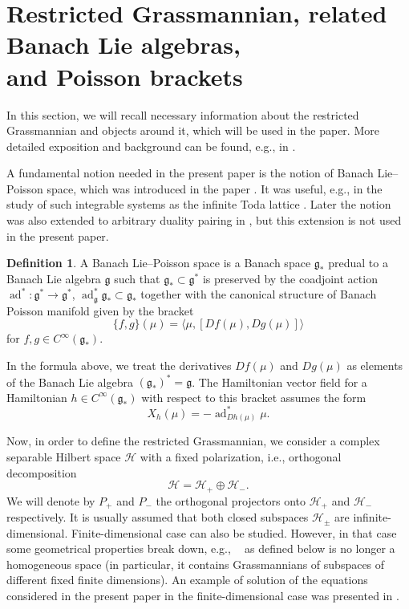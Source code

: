 \documentclass[pdftex]{sigma}
\theoremstyle{definition}
\newtheorem{defn}[thm]{Definition}
\numberwithin{equation}{section}
\renewcommand{\H}{\mathcal{H}}
\newcommand{\g}{\mathfrak{g}}
\DeclareMathOperator{\Gr}{Gr_{res}(\H,\H_+)}
\DeclareMathOperator{\ad}{ad}
\renewcommand{\to}{\rightarrow}
\newcommand{\be}{\begin{equation}}
\newcommand{\ee}{\end{equation}}
\begin{document}
\section[Restricted Grassmannian, related Banach Lie algebras, and Poisson brackets]{Restricted Grassmannian, related Banach Lie algebras,\\ and Poisson brackets}\label{sec:gr}

In this section, we will recall necessary information about the restricted Grassmannian and objects around it, which will be used in the paper. More detailed exposition and background can be found, e.g., in \cite{Ratiu-grass,GO-grass,mickelsson,OR,segal,wurzbacher}.

A fundamental notion needed in the present paper is the notion of Banach Lie--Poisson space, which was introduced in the paper \cite[Definition 4.1 and Theorem 4.2]{OR}. It was useful, e.g., in the study of such integrable systems as the infinite Toda lattice \cite{Oind}. Later the notion was also extended to arbitrary duality pairing in \cite[Definition 3.12 and Theorem 3.14]{tumpach-bruhat}, but this extension is not used in the present paper.


\begin{defn}\label{def:blp}
A Banach Lie--Poisson space is a Banach space $\g_*$ predual to a Banach Lie algebra $\g$ such that $\g_*\subset \g^*$ is preserved by the coadjoint action $\ad^*\colon\g^*\to\g^*$,
$\ad^*_\g \g_*\subset \g_*$
together with the canonical structure of Banach Poisson manifold given by the bracket
\[ %
\{f,g\}(\mu) = \langle \mu, [Df(\mu),Dg(\mu)] \rangle \]
for $f,g\in C^\infty(\g_*)$.
\end{defn}

In the formula above, we treat the derivatives $Df(\mu)$ and $Dg(\mu)$ as elements of the Banach Lie algebra $(\g_*)^*=\g$. The Hamiltonian vector field for a Hamiltonian $h\in C^\infty(\g_*)$ with respect to this bracket assumes the form
\be \label{blp-hvf}
X_h(\mu) = -\ad^*_{Dh(\mu)}\mu.\ee


Now, in order to define the restricted Grassmannian, we consider a complex separable Hilbert space $\H$ with a fixed polarization, i.e., orthogonal decomposition
\be\label{polarization}\H=\H_+\oplus \H_-.\ee
We will denote by $P_+$ and $P_-$ the orthogonal projectors onto $\H_+$ and $\H_-$ respectively. It is usually assumed that both closed subspaces $\H_\pm$ are infinite-dimensional.
Finite-dimensional case can also be studied. However, in that case some geometrical properties break down, e.g., $\Gr$ as defined below is no longer a homogeneous space (in particular, it contains Grassmannians of subspaces of different fixed finite dimensions). An example of solution of the equations considered in the present paper in the finite-dimensional case was presented in \cite{GT-partiso-bial}.
\end{document}
